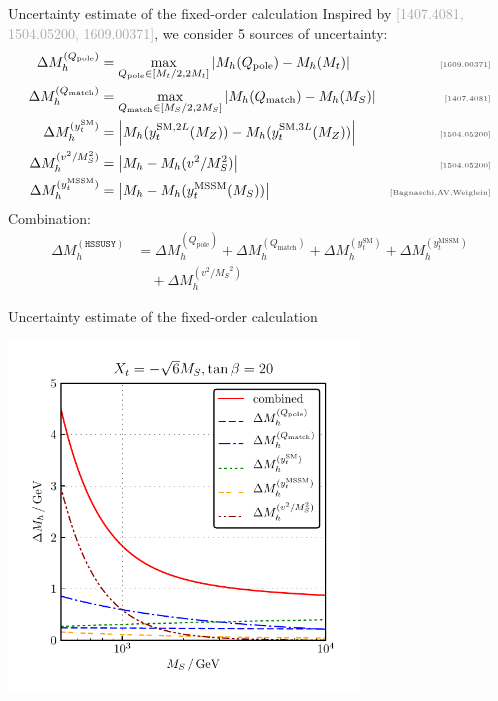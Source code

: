 \documentclass[hyperref={pdfpagelabels=false},ngerman]{beamer}
\newcommand{\MS}{\ensuremath{M_S}}
\newcommand{\mycite}[1]{\ensuremath{\text{\textcolor{darkgray}{\tiny [#1]}}}}
\newcommand{\bigcite}[1]{\textcolor{darkgray}{[#1]}}
\newcommand{\SM}{\ensuremath{\text{SM}}}
\newcommand{\MSSM}{\ensuremath{\text{MSSM}}}
\newcommand{\Qpole}{\ensuremath{Q_\text{pole}}}
\newcommand{\Qmatch}{\ensuremath{Q_\text{match}}}
\newcommand{\DMhQpole}{\ensuremath{\Delta M_h^{(\Qpole)}}}
\newcommand{\DMhQmatch}{\ensuremath{\Delta M_h^{(\Qmatch)}}}
\newcommand{\DMhHSSUSY}{\ensuremath{\Delta M_h^{(\HSSUSY)}}}
\newcommand{\DMhHSSUSYytSM}{\ensuremath{\Delta M_h^{(y_t^\SM)}}}
\newcommand{\DMhHSSUSYytMSSM}{\ensuremath{\Delta M_h^{(y_t^\MSSM)}}}
\newcommand{\DMhEFT}{\ensuremath{\Delta M_h^{(v^2/\MS^2)}}}
\def\HSSUSY{\texttt{HSSUSY}}
\begin{document}

\begin{frame}[noframenumbering]{Uncertainty estimate of the fixed-order calculation}
  Inspired by \bigcite{1407.4081, 1504.05200, 1609.00371}, we consider
  5 sources of uncertainty:
  \begin{align*}
    \DMhQpole &= \max_{\Qpole\in[M_t/2,2M_t]}\left|M_h(\Qpole) - M_h(M_t)\right| & \text{\mycite{1609.00371}} \\
    \DMhQmatch &= \max_{\Qmatch\in[\MS/2,2\MS]}\left|M_h(\Qmatch) - M_h(\MS)\right| & \text{\mycite{1407.4081}} \\
    \DMhHSSUSYytSM &= \left| M_h(y_t^{\SM,2L}(M_Z)) - M_h(y_t^{\SM,3L}(M_Z)) \right| & \text{\mycite{1504.05200}} \\
    \DMhEFT &= \left| M_h - M_h(v^2/\MS^2) \right| & \text{\mycite{1504.05200}} \\
    \DMhHSSUSYytMSSM &= \left| M_h - M_h(y_t^\MSSM(\MS)) \right| & \text{\mycite{Bagnaschi,AV,Weiglein}}
  \end{align*}
  Combination:
  \begin{align*}
    \DMhHSSUSY &= \DMhQpole + \DMhQmatch + \DMhHSSUSYytSM + \DMhHSSUSYytMSSM \\
    &\quad + \DMhEFT
  \end{align*}
\end{frame}


\begin{frame}[noframenumbering]{Uncertainty estimate of the fixed-order calculation}
  \begin{center}
    \includegraphics[width=0.7\textwidth]{plots/kuts-9/HSSUSY_TB-20_Xt--sqrt6_individual}
  \end{center}
\end{frame}
\end{document}
